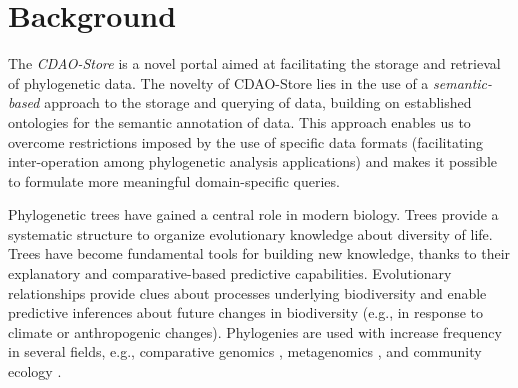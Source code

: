 \documentclass[10pt]{bmc_article}
\newenvironment{bmcformat}{\fussy\setboolean{publ}{true}}{\fussy}
\begin{document}
\begin{bmcformat}








\section*{Background}

The \emph{CDAO-Store} is a novel portal aimed at facilitating the storage 
and retrieval of phylogenetic data. The novelty of CDAO-Store lies in the use of a 
\emph{semantic-based}
approach to the storage and querying of data, building on established ontologies for the
semantic annotation of data. This approach enables us to overcome restrictions imposed
by the use of specific data formats (facilitating inter-operation among phylogenetic analysis
applications) and makes it possible to formulate more meaningful domain-specific queries.


Phylogenetic trees have gained a central role in modern biology. Trees provide  a
systematic structure to organize evolutionary knowledge about diversity of life. Trees
have become fundamental tools for building new knowledge, thanks to their explanatory
and comparative-based predictive capabilities. Evolutionary relationships provide 
clues about processes underlying biodiversity and enable predictive inferences about
future changes in biodiversity (e.g., in response to climate or anthropogenic changes).
Phylogenies are used with increase frequency in several fields, e.g., comparative
genomics \cite{Ell08}, metagenomics \cite{WE08}, and community ecology \cite{WAMD02}.


\end{bmcformat}
\end{document}

